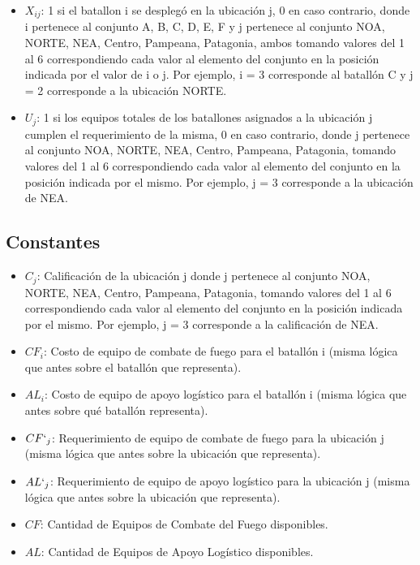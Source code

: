 \documentclass[12pt]{article}
\begin{document}
\begin{itemize}
    \item $X_{ij}$: 1 si el batallon i se desplegó en la ubicación j, 0 en caso contrario, donde i pertenece al conjunto {A, B, C, D, E, F} y j pertenece al conjunto {NOA, NORTE, NEA, Centro, Pampeana, Patagonia}, ambos tomando valores del 1 al 6 correspondiendo cada valor al elemento del conjunto en la posición indicada por el valor de i o j. Por ejemplo, i = 3 corresponde al batallón C y j = 2 corresponde a la ubicación NORTE. 
    \item $U_{j}$: 1 si los equipos totales de los batallones asignados a la ubicación j cumplen el requerimiento de la misma, 0 en caso contrario, donde j pertenece al conjunto {NOA, NORTE, NEA, Centro, Pampeana, Patagonia}, tomando valores del 1 al 6 correspondiendo cada valor al elemento del conjunto en la posición indicada por el mismo. Por ejemplo, j = 3 corresponde a la ubicación de NEA. 
\end{itemize}

\subsection{Constantes}

\begin{itemize}
    \item \textbf{$C_{j}$}: Calificación de la ubicación j donde j pertenece al conjunto {NOA, NORTE, NEA, Centro, Pampeana, Patagonia}, tomando valores del 1 al 6 correspondiendo cada valor al elemento del conjunto en la posición indicada por el mismo. Por ejemplo, j = 3 corresponde a la calificación de NEA.
    \item \textbf{$CF_{i}$}: Costo de equipo de combate de fuego para el batallón i (misma lógica que antes sobre el batallón que representa).
    \item \textbf{$AL_{i}$}: Costo de equipo de apoyo logístico para el batallón i (misma lógica que antes sobre qué batallón representa).
    \item \textbf{$CF`_{j}$}: Requerimiento de equipo de combate de fuego para la ubicación j (misma lógica que antes sobre la ubicación que representa).
    \item \textbf{$AL`_{j}$}: Requerimiento de equipo de apoyo logístico para la ubicación j (misma lógica que antes sobre la ubicación que representa).
    \item \textbf{$CF$}: Cantidad de Equipos de Combate del Fuego disponibles.
    \item \textbf{$AL$}: Cantidad de Equipos de Apoyo Logístico disponibles.
\end{itemize}
\end{document}

